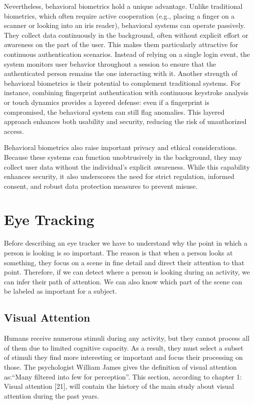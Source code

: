 \documentclass[12pt]{report}
\begin{document}
Nevertheless, behavioral biometrics hold a unique advantage. 
Unlike traditional biometrics, which often require active cooperation (e.g., placing a finger on a scanner or looking into an iris reader), behavioral systems can operate passively. 
They collect data continuously in the background, often without explicit effort or awareness on the part of the user. 
This makes them particularly attractive for continuous authentication scenarios. 
Instead of relying on a single login event, the system monitors user behavior throughout a session to ensure that the authenticated person remains the one interacting with it.
Another strength of behavioral biometrics is their potential to complement traditional systems. 
For instance, combining fingerprint authentication with continuous keystroke analysis or touch dynamics provides a layered defense: even if a fingerprint is compromised, the behavioral system can still flag anomalies. 
This layered approach enhances both usability and security, reducing the risk of unauthorized access.

Behavioral biometrics also raise important privacy and ethical considerations. 
Because these systems can function unobtrusively in the background, they may collect user data without the individual's explicit awareness. 
While this capability enhances security, it also underscores the need for strict regulation, informed consent, and robust data protection measures to prevent misuse.

\newpage

\chapter{Eye Tracking}

Before describing an eye tracker we have to understand why the point in which a person is looking is so important.
The reason is that when a person looks at something, they focus on a scene in fine detail and direct their attention to that point.
Therefore, if we can detect where a person is looking during an activity, we can infer their path of attention.
We can also know which part of the scene can be labeled as important for a subject.

\section{Visual Attention}
Humans receive numerous stimuli during any activity, but they cannot process all of them due to limited cognitive capacity.
As a result, they must select a subset of stimuli they find more interesting or important and focus their processing on those.
The psychologist William James gives the definition of visual attention as:“Many filtered into few for perception”.
This section, according to chapter 1: Visual attention [21], will contain the history of the main study about visual attention during the past years.
\end{document}
